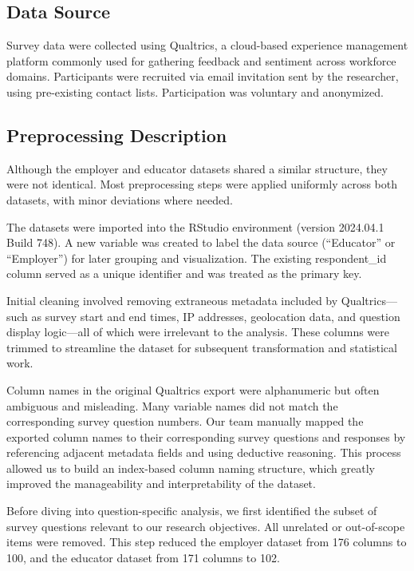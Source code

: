 \documentclass[
  11pt,
  letterpaper,
  DIV=11,
  numbers=noendperiod]{scrartcl}
\begin{document}
\subsection{Data Source}\label{data-source}

Survey data were collected using Qualtrics, a cloud-based experience
management platform commonly used for gathering feedback and sentiment
across workforce domains. Participants were recruited via email
invitation sent by the researcher, using pre-existing contact lists.
Participation was voluntary and anonymized.

\subsection{Preprocessing Description}\label{preprocessing-description}

Although the employer and educator datasets shared a similar structure,
they were not identical. Most preprocessing steps were applied uniformly
across both datasets, with minor deviations where needed.

The datasets were imported into the RStudio environment (version
2024.04.1 Build 748). A new variable was created to label the data
source (``Educator'' or ``Employer'') for later grouping and
visualization. The existing respondent\_id column served as a unique
identifier and was treated as the primary key.

Initial cleaning involved removing extraneous metadata included by
Qualtrics---such as survey start and end times, IP addresses,
geolocation data, and question display logic---all of which were
irrelevant to the analysis. These columns were trimmed to streamline the
dataset for subsequent transformation and statistical work.

Column names in the original Qualtrics export were alphanumeric but
often ambiguous and misleading. Many variable names did not match the
corresponding survey question numbers. Our team manually mapped the
exported column names to their corresponding survey questions and
responses by referencing adjacent metadata fields and using deductive
reasoning. This process allowed us to build an index-based column naming
structure, which greatly improved the manageability and interpretability
of the dataset.

Before diving into question-specific analysis, we first identified the
subset of survey questions relevant to our research objectives. All
unrelated or out-of-scope items were removed. This step reduced the
employer dataset from 176 columns to 100, and the educator dataset from
171 columns to 102.
\end{document}
